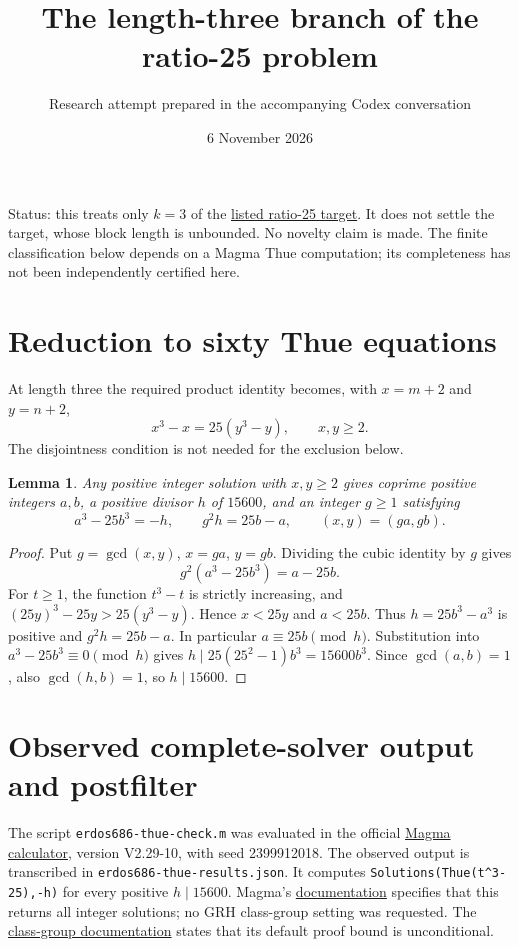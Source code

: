 \documentclass[11pt]{article}
\title{The length-three branch of the ratio-25 problem}
\author{Research attempt prepared in the accompanying Codex conversation}
\date{6 November 2026}
\newtheorem{lemma}{Lemma}
\begin{document}
\maketitle

\noindent
Status: this treats only $k=3$ of the
\href{https://conjectures.io/problems/erdos686-erdos-686-variants-twenty-five}{listed ratio-25 target}.
It does not settle the target, whose block length is unbounded. No novelty
claim is made. The finite classification below depends on a Magma Thue
computation; its completeness has not been independently certified here.

\section*{Reduction to sixty Thue equations}
At length three the required product identity becomes, with
$x=m+2$ and $y=n+2$,
\[
 x^3-x=25(y^3-y),\qquad x,y\ge2.
\]
The disjointness condition is not needed for the exclusion below.

\begin{lemma}
Any positive integer solution with $x,y\ge2$ gives coprime positive
integers $a,b$, a positive divisor $h$ of $15600$, and an integer $g\ge1$
satisfying
\[
 a^3-25b^3=-h,\qquad g^2h=25b-a,\qquad (x,y)=(ga,gb).
\]
\end{lemma}
\begin{proof}
Put $g=\gcd(x,y)$, $x=ga$, $y=gb$. Dividing the cubic identity by $g$
gives
\[
 g^2(a^3-25b^3)=a-25b.
\]
For $t\ge1$, the function $t^3-t$ is strictly increasing, and
$(25y)^3-25y>25(y^3-y)$. Hence $x<25y$ and $a<25b$.
Thus $h=25b^3-a^3$ is positive and $g^2h=25b-a$.
In particular $a\equiv25b\pmod h$. Substitution into
$a^3-25b^3\equiv0\pmod h$ gives
$h\mid25(25^2-1)b^3=15600b^3$.
Since $\gcd(a,b)=1$, also $\gcd(h,b)=1$, so $h\mid15600$.
\end{proof}

\section*{Observed complete-solver output and postfilter}
The script \texttt{erdos686-thue-check.m} was evaluated in the official
\href{https://magma.maths.usyd.edu.au/calc/}{Magma calculator}, version
V2.29-10, with seed 2399912018. The observed output is transcribed in
\texttt{erdos686-thue-results.json}. It computes
\texttt{Solutions(Thue(t\^{}3-25),-h)} for every positive $h\mid15600$.
Magma's \href{https://magma.maths.usyd.edu.au/magma/handbook/text/418}{documentation}
specifies that this returns all integer solutions; no GRH class-group
setting was requested. The
\href{https://magma.maths.usyd.edu.au/magma/handbook/text/416}{class-group documentation}
states that its default proof bound is unconditional.
\end{document}
